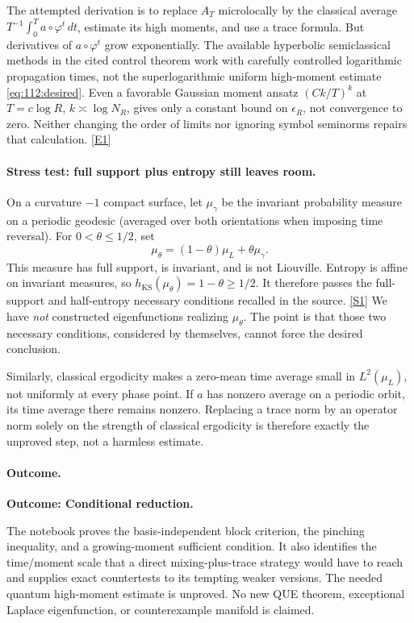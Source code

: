 \documentclass[11pt,a4paper]{article}
\newcommand{\sref}[2]{\hyperlink{source:#1:#2}{[S#2]}}
\newcommand{\eref}[2]{\hyperlink{extra:#1:#2}{[E#2]}}
\numberwithin{equation}{section}
\begin{document}
The attempted derivation is to replace $A_T$ microlocally by the classical
average $T^{-1}\int_0^T a\circ\varphi^t\,dt$, estimate its high moments,
and use a trace formula. But derivatives of $a\circ\varphi^t$ grow
exponentially. The available hyperbolic semiclassical methods in the cited
control theorem work with carefully controlled logarithmic propagation
times, not the superlogarithmic uniform high-moment estimate
\eqref{eq:112:desired}. Even a favorable Gaussian moment ansatz
$(Ck/T)^k$ at $T=c\log R$, $k\asymp\log N_R$, gives only a constant bound
on $\epsilon_R$, not convergence to zero. Neither changing the order of
limits nor ignoring symbol seminorms repairs that calculation.
\eref{112}{1}

\paragraph{Stress test: full support plus entropy still leaves room.}
On a curvature $-1$ compact surface, let $\mu_\gamma$ be the invariant
probability measure on a periodic geodesic (averaged over both orientations
when imposing time reversal). For $0<\theta\leq1/2$, set
\[
 \mu_\theta=(1-\theta)\mu_L+\theta\mu_\gamma.
\]
This measure has full support, is invariant, and is not Liouville. Entropy
is affine on invariant measures, so
$h_{\mathrm{KS}}(\mu_\theta)=1-\theta\geq1/2$.
It therefore passes the full-support and half-entropy necessary conditions
recalled in the source. \sref{112}{1}
We have \emph{not} constructed eigenfunctions realizing $\mu_\theta$.
The point is that those two necessary conditions, considered by themselves,
cannot force the desired conclusion.

Similarly, classical ergodicity makes a zero-mean time average small in
$L^2(\mu_L)$, not uniformly at every phase point. If $a$ has nonzero average
on a periodic orbit, its time average there remains nonzero. Replacing a
trace norm by an operator norm solely on the strength of classical
ergodicity is therefore exactly the unproved step, not a harmless estimate.

\paragraph{Outcome.}
\textbf{Outcome: Conditional reduction.}

The notebook proves the basis-independent block criterion, the pinching
inequality, and a growing-moment sufficient condition. It also identifies
the time/moment scale that a direct mixing-plus-trace strategy would have
to reach and supplies exact countertests to its tempting weaker versions.
The needed quantum high-moment estimate is unproved. No new QUE theorem,
exceptional Laplace eigenfunction, or counterexample manifold is claimed.
\end{document}
